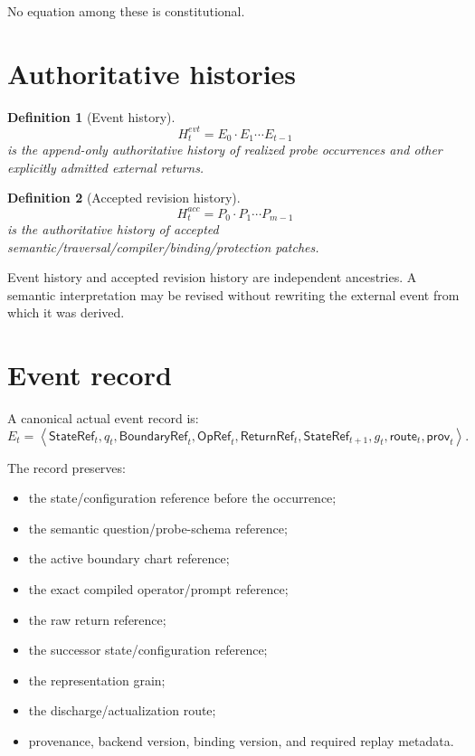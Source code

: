 \documentclass[11pt,oneside]{article}
\newtheorem{definition}{Definition}[section]
\newcommand{\StateRef}{\mathsf{StateRef}}
\newcommand{\ReturnRef}{\mathsf{ReturnRef}}
\newcommand{\OpRef}{\mathsf{OpRef}}
\newcommand{\BoundaryRef}{\mathsf{BoundaryRef}}
\begin{document}
No equation among these is constitutional.

\section{Authoritative histories}

\begin{definition}[Event history]
\[
\boxed{
H_t^{evt}=E_0\cdot E_1\cdots E_{t-1}
}
\]
is the append-only authoritative history of realized probe occurrences and other explicitly admitted external returns.
\end{definition}

\begin{definition}[Accepted revision history]
\[
\boxed{
H_t^{acc}=P_0\cdot P_1\cdots P_{m-1}
}
\]
is the authoritative history of accepted semantic/traversal/compiler/binding/protection patches.
\end{definition}

Event history and accepted revision history are independent ancestries.  A semantic interpretation may be revised without rewriting the external event from which it was derived.

\section{Event record}

A canonical actual event record is:
\[
\boxed{
E_t=
\left\langle
\StateRef_t,
q_t,
\BoundaryRef_t,
\OpRef_t,
\ReturnRef_t,
\StateRef_{t+1},
g_t,
\mathsf{route}_t,
\mathsf{prov}_t
\right\rangle.
}
\]

The record preserves:
\begin{itemize}
\item the state/configuration reference before the occurrence;
\item the semantic question/probe-schema reference;
\item the active boundary chart reference;
\item the exact compiled operator/prompt reference;
\item the raw return reference;
\item the successor state/configuration reference;
\item the representation grain;
\item the discharge/actualization route;
\item provenance, backend version, binding version, and required replay metadata.
\end{itemize}
\end{document}
